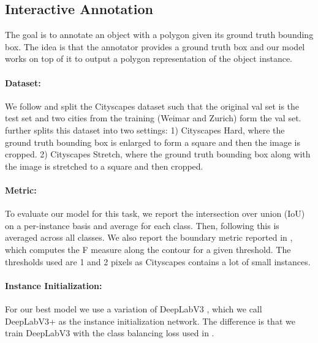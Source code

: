 \documentclass[10pt,twocolumn,letterpaper]{article}
\begin{document}
\subsection{Interactive Annotation} \label{ssec:annot}
The goal is to annotate an object with a polygon given its ground truth bounding box. The idea is that the annotator provides a ground truth box and our model works on top of it to output a polygon representation of the object instance.

\vspace{-.4mm}

\paragraph{Dataset:}
We follow \cite{polygon-rnn} and split the Cityscapes dataset such that the original val set is the test set and two cities from the training (Weimar and Zurich) form the val set. \cite{wang2019delse} further splits this dataset into two settings: 1) Cityscapes Hard, where the ground truth bounding box is enlarged to form a square and then the image is cropped. 2) Cityscapes Stretch, where the ground truth bounding box along with the image is stretched to a square and then cropped.

\vspace{-.4mm}

\paragraph{Metric:}
To evaluate our model for this task, we report the intersection over union (IoU) on a per-instance basis and average for each class. Then, following \cite{polygon-rnn} this is averaged across all classes. We also report the  boundary metric reported in \cite{wang2019delse, Perazzi2016}, which computes the F measure along the contour for a given threshold. The thresholds used are 1 and 2 pixels as Cityscapes contains a lot of small instances.

\vspace{-.4mm}


\paragraph{Instance Initialization:}
For our best model we use a variation of DeepLabV3 \cite{deeplabv3}, which we call DeepLabV3+ as the instance initialization network. The difference is that we train DeepLabV3 with the class balancing loss used in \cite{dextr}.
\end{document}
